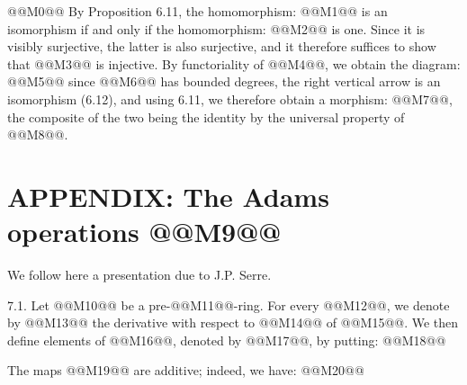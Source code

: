 @@M0@@
By Proposition 6.11, the homomorphism: @@M1@@ is an isomorphism if and only if the homomorphism: @@M2@@ is one. Since it is visibly surjective, the latter is also surjective, and it therefore suffices to show that @@M3@@ is injective. By functoriality of @@M4@@, we obtain the diagram:
@@M5@@
since @@M6@@ has bounded degrees, the right vertical arrow is an isomorphism (6.12), and using 6.11, we therefore obtain a morphism: @@M7@@, the composite of the two being the identity by the universal property of @@M8@@.

\section*{APPENDIX: The Adams operations @@M9@@}

We follow here a presentation due to J.P. Serre.

7.1. Let @@M10@@ be a pre-@@M11@@-ring. For every @@M12@@, we denote by @@M13@@ the derivative with respect to @@M14@@ of @@M15@@. We then define elements of @@M16@@, denoted by @@M17@@, by putting:
@@M18@@

The maps @@M19@@ are additive; indeed, we have:
@@M20@@
